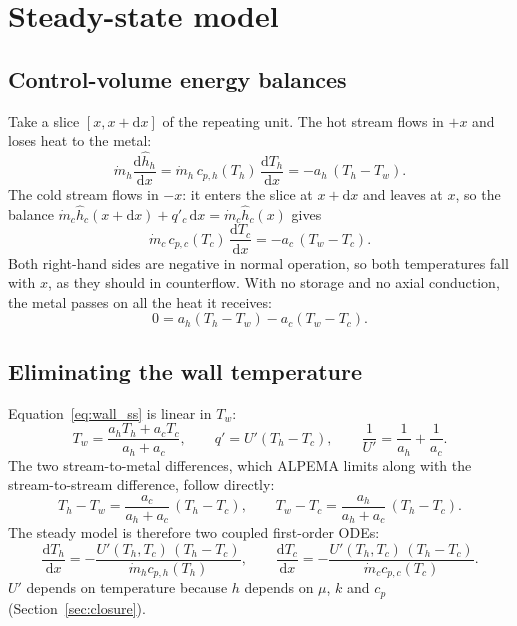 \documentclass[11pt]{article}
\newcommand{\dd}{\mathrm{d}}
\begin{document}
\section{Steady-state model}

\subsection{Control-volume energy balances}

Take a slice $[x, x+\dd x]$ of the repeating unit. The hot stream flows in $+x$ and loses heat to the metal:
\begin{equation}
  \dot m_h \frac{\dd \hat h_h}{\dd x} = \dot m_h\, c_{p,h}(T_h)\,\frac{\dd T_h}{\dd x} = -a_h\,(T_h - T_w).
  \label{eq:hot}
\end{equation}
The cold stream flows in $-x$: it enters the slice at $x+\dd x$ and leaves at $x$, so the balance $\dot m_c \hat h_c(x+\dd x) + q'_c\,\dd x = \dot m_c \hat h_c(x)$ gives
\begin{equation}
  \dot m_c\, c_{p,c}(T_c)\,\frac{\dd T_c}{\dd x} = -a_c\,(T_w - T_c).
  \label{eq:cold}
\end{equation}
Both right-hand sides are negative in normal operation, so both temperatures fall with $x$, as they should in counterflow. With no storage and no axial conduction, the metal passes on all the heat it receives:
\begin{equation}
  0 = a_h (T_h - T_w) - a_c (T_w - T_c).
  \label{eq:wall_ss}
\end{equation}

\subsection{Eliminating the wall temperature}

Equation~\eqref{eq:wall_ss} is linear in $T_w$:
\begin{equation}
  T_w = \frac{a_h T_h + a_c T_c}{a_h + a_c},
  \qquad
  q' = U'(T_h - T_c),
  \qquad
  \frac{1}{U'} = \frac{1}{a_h} + \frac{1}{a_c}.
  \label{eq:Tw}
\end{equation}
The two stream-to-metal differences, which ALPEMA limits along with the stream-to-stream difference, follow directly:
\begin{equation}
  T_h - T_w = \frac{a_c}{a_h + a_c}\,(T_h - T_c),
  \qquad
  T_w - T_c = \frac{a_h}{a_h + a_c}\,(T_h - T_c).
  \label{eq:sm}
\end{equation}
The steady model is therefore two coupled first-order ODEs:
\begin{equation}
  \frac{\dd T_h}{\dd x} = -\frac{U'(T_h,T_c)\,(T_h - T_c)}{\dot m_h c_{p,h}(T_h)},
  \qquad
  \frac{\dd T_c}{\dd x} = -\frac{U'(T_h,T_c)\,(T_h - T_c)}{\dot m_c c_{p,c}(T_c)}.
  \label{eq:ode_ss}
\end{equation}
$U'$ depends on temperature because $h$ depends on $\mu$, $k$ and $c_p$ (Section~\ref{sec:closure}).
\end{document}
